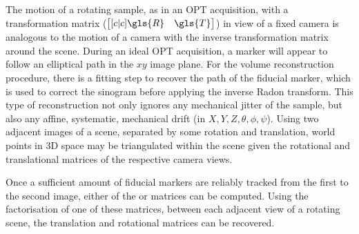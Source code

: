 \documentclass{osa-article}
\begin{document}
The motion of a rotating sample, as in an \gls{OPT} acquisition, with a transformation matrix (\( \begin{bmatrix}[c|c] \gls{R} & \gls{T} \end{bmatrix}\)) in view of a fixed camera is analogous to the motion of a camera with the inverse transformation matrix around the scene. %
During an ideal \gls{OPT} acquisition, a marker will appear to follow an elliptical path in the \(xy\) image plane. For the volume reconstruction procedure, there is a fitting step to recover the path of the fiducial marker, which is used to correct the sinogram before applying the inverse \gls{Radon transform}. This type of reconstruction not only ignores any mechanical jitter of the sample, but also any affine, systematic, mechanical drift (in \(X,Y,Z,\theta,\phi,\psi \)). %
Using two adjacent images of a scene, separated by some rotation and translation, world points in 3D space may be triangulated within the scene given the rotational and translational matrices of the respective camera views.



Once a sufficient amount of fiducial markers are reliably tracked from the first to the second image, either of the  or  matrices can be computed. Using the factorisation of one of these matrices, between each adjacent view of a rotating scene, the translation and rotational matrices can be recovered.
\end{document}
